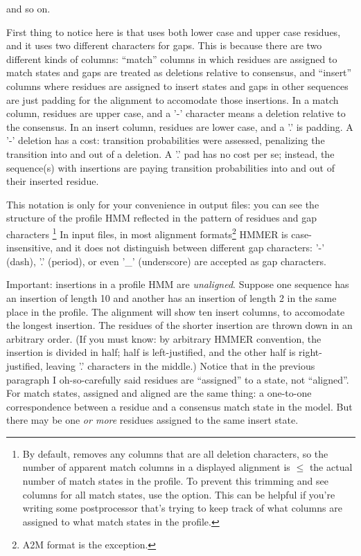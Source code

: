 and so on. 

First thing to notice here is that  uses both lower
case and upper case residues, and it uses two different characters for
gaps.  This is because there are two different kinds of columns:
``match'' columns in which residues are assigned to match states and
gaps are treated as deletions relative to consensus, and ``insert''
columns where residues are assigned to insert states and gaps in other
sequences are just padding for the alignment to accomodate those
insertions. In a match column, residues are upper case, and a '-'
character means a deletion relative to the consensus. In an insert
column, residues are lower case, and a '.' is padding.  A '-' deletion
has a cost: transition probabilities were assessed, penalizing the
transition into and out of a deletion. A '.' pad has no cost per se;
instead, the sequence(s) with insertions are paying transition
probabilities into and out of their inserted residue.

This notation is only for your convenience in output files: you can
see the structure of the profile HMM reflected in the pattern of
residues and gap characters \footnote{By default, 
  removes any columns that are all deletion characters, so the number
  of apparent match columns in a displayed alignment is $\leq$ the
  actual number of match states in the profile. To prevent this
  trimming and see columns for all match states, use the
   option. This can be helpful if you're writing some
  postprocessor that's trying to keep track of what columns are
  assigned to what match states in the profile.}  In input files, in
most alignment formats\footnote{A2M format is the exception.} HMMER is
case-insensitive, and it does not distinguish between different gap
characters: '-' (dash), '.' (period), or even '\_' (underscore) are
accepted as gap characters.

Important: insertions in a profile HMM are \emph{unaligned}. Suppose
one sequence has an insertion of length 10 and another has an
insertion of length 2 in the same place in the profile. The alignment
will show ten insert columns, to accomodate the longest insertion.
The residues of the shorter insertion are thrown down in an arbitrary
order. (If you must know: by arbitrary HMMER convention, the insertion
is divided in half; half is left-justified, and the other half is
right-justified, leaving '.' characters in the middle.)  Notice that
in the previous paragraph I oh-so-carefully said residues are
``assigned'' to a state, not ``aligned''. For match states, assigned
and aligned are the same thing: a one-to-one correspondence between a
residue and a consensus match state in the model. But there may be one
\emph{or more} residues assigned to the same insert state.

